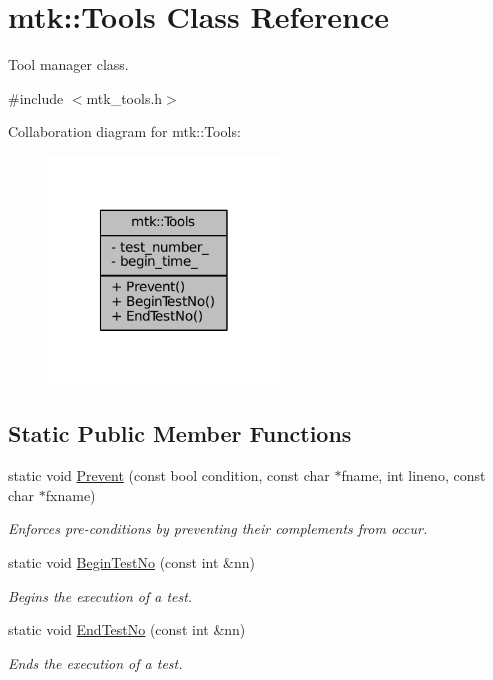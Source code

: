 \hypertarget{classmtk_1_1Tools}{\section{mtk\-:\-:Tools Class Reference}
\label{classmtk_1_1Tools}
}


Tool manager class.  




{\ttfamily \#include $<$mtk\-\_\-tools.\-h$>$}



Collaboration diagram for mtk\-:\-:Tools\-:
\nopagebreak
\begin{figure}[H]
\begin{center}
\leavevmode
\includegraphics[width=174pt]{classmtk_1_1Tools__coll__graph}
\end{center}
\end{figure}
\subsection*{Static Public Member Functions}
\begin{DoxyCompactItemize}
\item 
static void \hyperlink{classmtk_1_1Tools_acbcff02946d3db565d53ecbcc459f0b5}{Prevent} (const bool condition, const char $\ast$fname, int lineno, const char $\ast$fxname)
\begin{DoxyCompactList}\small\item\em Enforces pre-\/conditions by preventing their complements from occur. \end{DoxyCompactList}\item 
static void \hyperlink{classmtk_1_1Tools_a35cefa938105619b731ea4fedb86becf}{Begin\-Test\-No} (const int \&nn)
\begin{DoxyCompactList}\small\item\em Begins the execution of a test. \end{DoxyCompactList}\item 
static void \hyperlink{classmtk_1_1Tools_a5d3f78d17228fb36a73567c191f0f4ee}{End\-Test\-No} (const int \&nn)
\begin{DoxyCompactList}\small\item\em Ends the execution of a test. \end{DoxyCompactList}\end{DoxyCompactItemize}
